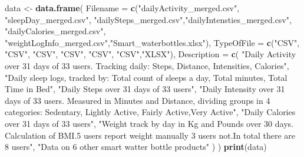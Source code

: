 \documentclass[
]{article}
\newenvironment{Shaded}{\begin{snugshade}}{\end{snugshade}}
\newcommand{\AttributeTok}[1]{\textcolor[rgb]{0.13,0.29,0.53}{#1}}
\newcommand{\FunctionTok}[1]{\textcolor[rgb]{0.13,0.29,0.53}{\textbf{#1}}}
\newcommand{\NormalTok}[1]{#1}
\newcommand{\OtherTok}[1]{\textcolor[rgb]{0.56,0.35,0.01}{#1}}
\newcommand{\StringTok}[1]{\textcolor[rgb]{0.31,0.60,0.02}{#1}}
\begin{document}
\begin{Shaded}
\begin{Highlighting}[]
\NormalTok{data }\OtherTok{\textless{}{-}} \FunctionTok{data.frame}\NormalTok{(}
  \AttributeTok{Filename =} \FunctionTok{c}\NormalTok{(}\StringTok{"dailyActivity\_merged.csv"}\NormalTok{, }\StringTok{"sleepDay\_merged.csv"}\NormalTok{, }\StringTok{"dailySteps\_merged.csv"}\NormalTok{,}\StringTok{"dailyIntensties\_merged.csv"}\NormalTok{, }\StringTok{"dailyCalories\_merged.csv"}\NormalTok{, }\StringTok{"weightLogInfo\_merged.csv"}\NormalTok{,}\StringTok{"Smart\_waterbottles.xlsx"}\NormalTok{),}
  \AttributeTok{TypeOfFile =} \FunctionTok{c}\NormalTok{(}\StringTok{"CSV"}\NormalTok{, }\StringTok{"CSV"}\NormalTok{, }\StringTok{"CSV"}\NormalTok{, }\StringTok{"CSV"}\NormalTok{, }\StringTok{"CSV"}\NormalTok{, }\StringTok{"CSV"}\NormalTok{,}\StringTok{"XLSX"}\NormalTok{),}
  \AttributeTok{Description =} \FunctionTok{c}\NormalTok{(}
    \StringTok{"Daily Activity over 31 days of 33 users. Tracking daily: Steps, Distance, Intensities, Calories"}\NormalTok{,}
    \StringTok{"Daily sleep logs, tracked by: Total count of sleeps a day, Total minutes, Total Time in Bed"}\NormalTok{,}
    \StringTok{"Daily Steps over 31 days of 33 users"}\NormalTok{,}
    \StringTok{"Daily Intensity over 31 days of 33 users. Measured in Minutes and Distance, dividing groups in 4 categories: Sedentary, Lightly Active, Fairly Active,Very Active"}\NormalTok{,}
    \StringTok{"Daily Calories over 31 days of 33 users"}\NormalTok{,}
    \StringTok{"Weight track by day in Kg and Pounds over 30 days. Calculation of BMI.5 users report weight manually 3 users not.In total there are 8 users"}\NormalTok{,}
    \StringTok{"Data on 6 other smart watter bottle products"}
\NormalTok{  )}
\NormalTok{)}
\FunctionTok{print}\NormalTok{(data)}
\end{Highlighting}
\end{Shaded}
\end{document}
